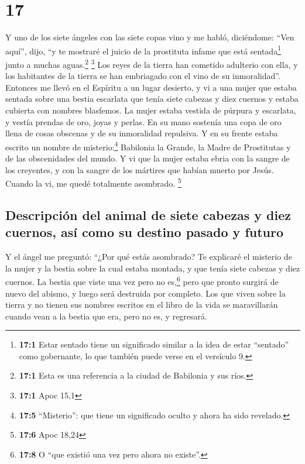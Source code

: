 \hypertarget{section-16}{%
\section{17}\label{section-16}}

 Y uno de los siete ángeles con las siete copas vino y me
habló, diciéndome: ``Ven aquí'', dijo, ``y te mostraré el juicio de la
prostituta infame que está sentada\footnote{\textbf{17:1} Estar sentado
  tiene un significado similar a la idea de estar ``sentado'' como
  gobernante, lo que también puede verse en el versículo 9.} junto a
muchas aguas.\footnote{\textbf{17:1} Esta es una referencia a la ciudad
  de Babilonia y sus ríos.} \footnote{\textbf{17:1} Apoc 15,1}
 Los reyes de la tierra han cometido adulterio con ella, y
los habitantes de la tierra se han embriagado con el vino de su
inmoralidad''.  Entonces me llevó en el Espíritu a un
lugar desierto, y vi a una mujer que estaba sentada sobre una bestia
escarlata que tenía siete cabezas y diez cuernos y estaba cubierta con
nombres blasfemos.  La mujer estaba vestida de púrpura y
escarlata, y vestía prendas de oro, joyas y perlas. En su mano sostenía
una copa de oro llena de cosas obscenas y de su inmoralidad repulsiva.
 Y en su frente estaba escrito un nombre de
misterio:\footnote{\textbf{17:5} ``Misterio'': que tiene un significado
  oculto y ahora ha sido revelado.} Babilonia la Grande, la Madre de
Prostitutas y de las obscenidades del mundo.  Y vi que la
mujer estaba ebria con la sangre de los creyentes, y con la sangre de
los mártires que habían muerto por Jesús. Cuando la vi, me quedé
totalmente asombrado. \footnote{\textbf{17:6} Apoc 18,24}

\hypertarget{descripciuxf3n-del-animal-de-siete-cabezas-y-diez-cuernos-asuxed-como-su-destino-pasado-y-futuro}{%
\subsection{Descripción del animal de siete cabezas y diez cuernos, así
como su destino pasado y
futuro}\label{descripciuxf3n-del-animal-de-siete-cabezas-y-diez-cuernos-asuxed-como-su-destino-pasado-y-futuro}}

 Y el ángel me preguntó: ``¿Por qué estás asombrado? Te
explicaré el misterio de la mujer y la bestia sobre la cual estaba
montada, y que tenía siete cabezas y diez cuernos.  La
bestia que viste una vez pero no es,\footnote{\textbf{17:8} O ``que
  existió una vez pero ahora no existe''.} pero que pronto surgirá de
nuevo del abismo, y luego será destruida por completo. Los que viven
sobre la tierra y no tienen sus nombres escritos en el libro de la vida
se maravillarán cuando vean a la bestia que era, pero no es, y
regresará.

